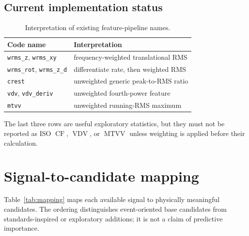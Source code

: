 \documentclass[letterpaper,journal]{IEEEtran}
\newcommand{\MTVV}{\operatorname{MTVV}}
\newcommand{\VDV}{\operatorname{VDV}}
\newcommand{\CF}{\operatorname{CF}}
\begin{document}
\subsection{Current implementation status}

\begin{table}[t]
\centering
\caption{Interpretation of existing feature-pipeline names.}
\label{tab:implementation}
\begin{tabular}{@{}ll@{}}
\toprule
Code name & Interpretation \\
\midrule
\texttt{wrms\_z}, \texttt{wrms\_xy} & frequency-weighted translational RMS \\
\texttt{wrms\_rot}, \texttt{wrms\_z\_d} & differentiate rate, then weighted RMS \\
\texttt{crest} & unweighted generic peak-to-RMS ratio \\
\texttt{vdv}, \texttt{vdv\_deriv} & unweighted fourth-power feature \\
\texttt{mtvv} & unweighted running-RMS maximum \\
\bottomrule
\end{tabular}
\end{table}
The last three rows are useful exploratory statistics, but they must not be reported as ISO
$\CF$, $\VDV$, or $\MTVV$ unless weighting is applied before their calculation.

\section{Signal-to-candidate mapping}

Table~\ref{tab:mapping} maps each available signal to physically meaningful candidates.
The ordering distinguishes event-oriented base candidates from standards-inspired or
exploratory additions; it is not a claim of predictive importance.
\end{document}
